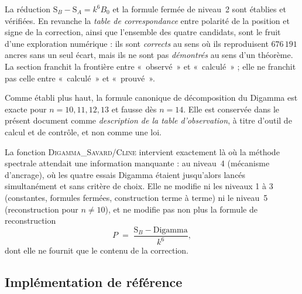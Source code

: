 \documentclass[11pt,a4paper]{article}
\newcommand{\SA}{\mathrm{S}_A}
\newcommand{\SB}{\mathrm{S}_B}
\begin{document}
\vspace{0.3cm}
\begin{boitealerte}
La réduction $\SB-\SA = k^{6}B_0$ et la formule fermée de niveau~2 sont
établies et vérifiées. En revanche la \emph{table de correspondance}
entre polarité de la position et signe de la correction, ainsi que
l'ensemble des quatre candidats, sont le fruit d'une exploration
numérique : ils sont \emph{corrects} au sens où ils reproduisent
$676\,191$ ancres sans un seul écart, mais ils ne sont pas
\emph{démontrés} au sens d'un théorème. La section franchit la
frontière entre «~observé~» et «~calculé~» ; elle ne franchit pas celle
entre «~calculé~» et «~prouvé~».
\end{boitealerte}

\vspace{0.3cm}
\begin{boitealerte}
Comme établi plus haut, la formule canonique de décomposition du
Digamma est exacte pour $n = 10, 11, 12, 13$ et fausse dès $n = 14$.
Elle est conservée dans le présent document comme \emph{description
de la table d'observation}, à titre d'outil de calcul et de
contrôle, et non comme une loi.
\end{boitealerte}

\vspace{0.3cm}
\begin{boitenote}
La fonction \textsc{Digamma\_Savard}/\textsc{Cline} intervient exactement là où la
méthode spectrale attendait une information manquante : au niveau~4 (mécanisme
d'ancrage), où les quatre essais Digamma étaient jusqu'alors lancés
simultanément et sans critère de choix. Elle ne modifie ni les niveaux 1 à 3
(constantes, formules fermées, construction terme à terme) ni le niveau~5
(reconstruction pour $n \neq 10$), et ne modifie pas non plus la formule de
reconstruction
\[
P \;=\; \frac{\SB - \mathrm{Digamma}}{k^{6}},
\]
dont elle ne fournit que le contenu de la correction.
\end{boitenote}



\subsection{Implémentation de référence}
\end{document}
